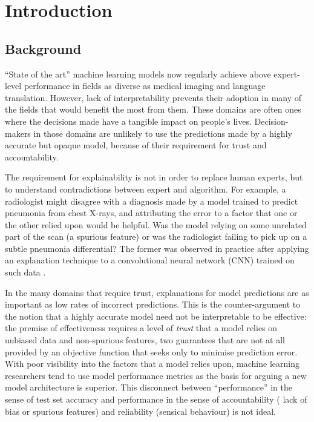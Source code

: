 \documentclass[main]{subfiles}
\begin{document}
\chapter{Introduction}

\section{Background} \label{sec:background}

``State of the art'' machine learning models now regularly achieve above expert-level performance in fields as diverse as medical imaging and language translation. However, lack of interpretability prevents their adoption in many of the fields that would benefit the most from them. These domains are often ones where the decisions made have a tangible impact on people's lives. Decision-makers in those domains are unlikely to use the predictions made by a highly accurate but opaque model, because of their requirement for trust and accountability. 

The requirement for explainability is not in order to replace human experts, but to understand contradictions between expert and algorithm. For example, a radiologist might disagree with a diagnosis made by a model trained to predict pneumonia from chest X-rays, and attributing the error to a factor that one or the other relied upon would be helpful. Was the model relying on some unrelated part of the scan (a spurious feature) or was the radiologist failing to pick up on a subtle pneumonia differential? The former was observed in practice after applying an explanation technique to a convolutional neural network (CNN) trained on such data \cite{xray}. 

In the many domains that require trust, explanations for model predictions are as important as low rates of incorrect predictions. This is the counter-argument to the notion that a highly accurate model need not be interpretable to be effective: the premise of effectiveness requires a level of \textit{trust} that a model relies on unbiased data and non-spurious features, two guarantees that are not at all provided by an objective function that seeks only to minimise prediction error. With poor visibility into the factors that a model relies upon, machine learning researchers tend to use model performance metrics as the basis for arguing a new model architecture is superior. This disconnect between ``performance'' in the sense of test set accuracy and performance in the sense of accountability ( lack of bias or spurious features) and reliability (sensical behaviour) is not ideal.
\end{document}
